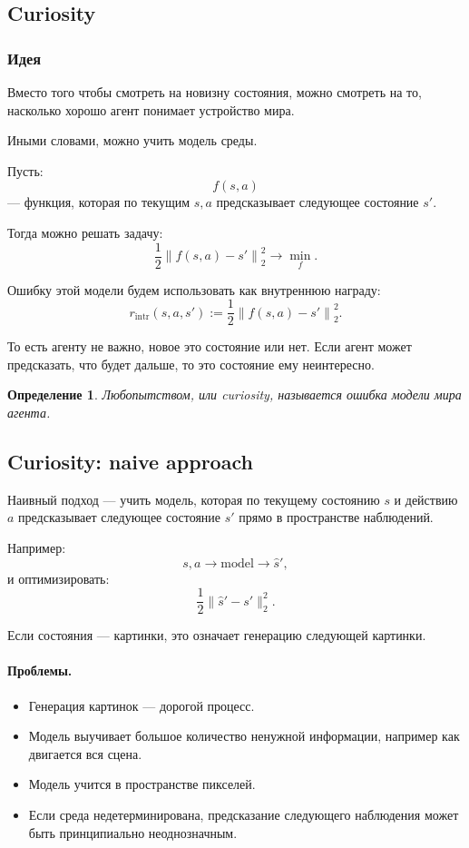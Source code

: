 \documentclass[12pt,a4paper]{article}
\newtheorem{definition}{Определение}
\begin{document}
\subsection{Curiosity}

\subsubsection{Идея}

Вместо того чтобы смотреть на новизну состояния, можно смотреть на то, насколько хорошо агент понимает устройство мира.

Иными словами, можно учить модель среды.

Пусть:
\[
f(s,a)
\]
--- функция, которая по текущим $s,a$ предсказывает следующее состояние $s'$.

Тогда можно решать задачу:
\[
\frac{1}{2}
\left\|
f(s,a)-s'
\right\|_2^2
\to
\min_f.
\]

Ошибку этой модели будем использовать как внутреннюю награду:
\[
r_{\mathrm{intr}}(s,a,s')
:=
\frac{1}{2}
\left\|
f(s,a)-s'
\right\|_2^2.
\]

То есть агенту не важно, новое это состояние или нет. Если агент может предсказать, что будет дальше, то это состояние ему неинтересно.

\begin{definition}
Любопытством, или curiosity, называется ошибка модели мира агента.
\end{definition}

\subsection{Curiosity: naive approach}

Наивный подход --- учить модель, которая по текущему состоянию $s$ и действию $a$ предсказывает следующее состояние $s'$ прямо в пространстве наблюдений.

Например:
\[
s,a
\longrightarrow
\text{model}
\longrightarrow
\hat s',
\]
и оптимизировать:
\[
\frac{1}{2}
\|\hat s'-s'\|_2^2.
\]

Если состояния --- картинки, это означает генерацию следующей картинки.

\paragraph{Проблемы.}

\begin{itemize}
    \item Генерация картинок --- дорогой процесс.
    \item Модель выучивает большое количество ненужной информации, например как двигается вся сцена.
    \item Модель учится в пространстве пикселей.
    \item Если среда недетерминирована, предсказание следующего наблюдения может быть принципиально неоднозначным.
\end{itemize}
\end{document}
